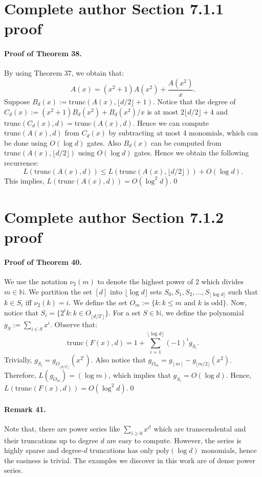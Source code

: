 \section*{Complete author Section 7.1.1 proof}
\paragraph{Proof of Theorem 38.} By using Theorem 37, we obtain that:
\[A(x)=(x^2+1)A(x^2)+\frac{A(x^2)}x.\tag{3}\]
Suppose $B_d(x):=\mathrm{trunc}(A(x),\lfloor d/2\rfloor+1)$. Notice that the degree of $C_d(x):=(x^2+1)B_d(x^2)+B_d(x^2)/x$ is at most $2\lfloor d/2\rfloor+4$ and $\mathrm{trunc}(C_d(x),d)=\mathrm{trunc}(A(x),d)$. Hence we can compute $\mathrm{trunc}(A(x),d)$ from $C_d(x)$ by subtracting at most 4 monomials, which can be done using $O(\log d)$ gates. Also $B_d(x)$ can be computed from $\mathrm{trunc}(A(x),\lfloor d/2\rfloor)$ using $O(\log d)$ gates. Hence we obtain the following recurrence:
\[L(\mathrm{trunc}(A(x),d))\le L(\mathrm{trunc}(A(x),\lfloor d/2\rfloor))+O(\log d).\]
This implies, $L(\mathrm{trunc}(A(x),d))=O(\log^2d)$.\qed
\section*{Complete author Section 7.1.2 proof}
\paragraph{Proof of Theorem 40.} We use the notation $\nu_2(m)$ to denote the highest power of 2 which divides $m\in\mathbb N$. We partition the set $[d]$ into $\lfloor\log d\rfloor$ sets $S_0,S_1,S_2,\ldots,S_{\lfloor\log d\rfloor}$ such that $k\in S_i$ iff $\nu_2(k)=i$. We define the set $O_m:=\{k:k\le m\text{ and }k\text{ is odd}\}$. Now, notice that $S_i=\{2^ik:k\in O_{\lfloor d/2^i\rfloor}\}$. For a set $S\in\mathbb N$, we define the polynomial $g_S:=\sum_{i\in S}x^i$. Observe that:
\[\mathrm{trunc}(F(x),d)=1+\sum_{i=1}^{\lfloor\log d\rfloor}(-1)^ig_{S_i}.\]
Trivially, $g_{S_i}=g_{O_{\lfloor d/2^i\rfloor}}(x^{2^i})$. Also notice that $g_{O_m}=g_{[m]}-g_{\lfloor m/2\rfloor}(x^2)$. Therefore, $L(g_{O_m})=(\log m)$, which implies that $g_{S_i}=O(\log d)$. Hence, $L(\mathrm{trunc}(F(x),d))=O(\log^2d)$.\qed
\paragraph{Remark 41.} Note that, there are power series like $\sum_{i\ge0}x^{i!}$ which are transcendental and their truncations up to degree $d$ are easy to compute. However, the series is highly sparse and degree-$d$ truncations has only $\mathrm{poly}(\log d)$ monomials, hence the easiness is trivial. The examples we discover in this work are of dense power series.
